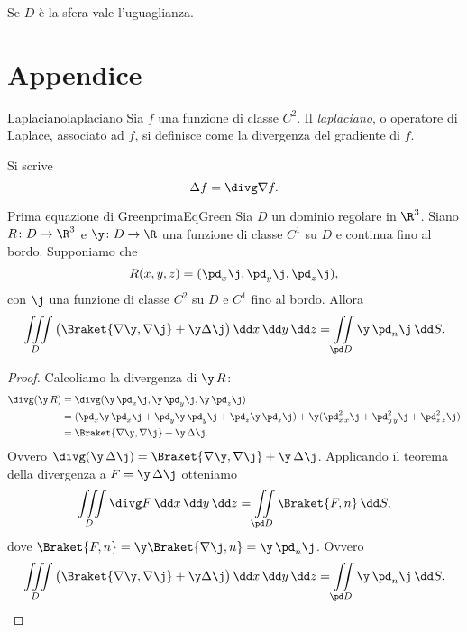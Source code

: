 \begin{oss}
	Se \(D\) è la sfera vale l'uguaglianza.
\end{oss}
\section{Appendice}

\begin{defn}{Laplaciano}{laplaciano}
	Sia \(f\) una funzione di classe \(C^2\).
	Il \emph{laplaciano}, o operatore di Laplace, associato ad \(f\), si definisce come la divergenza del gradiente di \(f\).
\end{defn}

\begin{notz}
	Si scrive
	\[
		\Delta f = \divg \nabla f.
	\]
\end{notz}

\begin{prop}{Prima equazione di Green}{primaEqGreen}
	Sia \(D\) un dominio regolare in \(\R^3\).
	Siano \(R\colon D \to \R^3\) e \(\y\colon D \to \R\) una funzione di classe \(C^1\) su \(D\) e continua fino al bordo.
	Supponiamo che
	\[
		R(x,y,z) = (\pd_x \j,\pd_y \j, \pd_z \j),
	\]
	con \(\j\) una funzione di classe \(C^2\) su \(D\) e \(C^1\) fino al bordo.
	Allora
	\[
		\iiint\limits_D \big(\Braket{\nabla \y,\nabla \j} + \y\Delta \j\big)\,\dd x\,\dd y\,\dd z = \iint\limits_{\pd D} \y\,\pd_n \j\,\dd S.
	\]
\end{prop}

\begin{proof}
	Calcoliamo la divergenza di \(\y\,R\):
	\[
		\begin{split}
			\divg (\y\,R) & = \divg(\y\,\pd _x\j, \y\,\pd_y \j,\y\,\pd_z \j)\\
			& = (\pd_x \y\,\pd_x \j + \pd_y \y\,\pd_y \j + \pd_z \y\,\pd _z \j) + \y(\pd_{x\,x}^2 \j + \pd_{y\,y}^2 \j + \pd_{z\,z}^2 \j)\\
			& = \Braket{\nabla \y,\nabla \j} + \y \,\Delta \j.
		\end{split}
	\]
	Ovvero \(\divg(\y\,\Delta \j) = \Braket{\nabla \y,\nabla \j} + \y\,\Delta \j\).
	Applicando il teorema della divergenza a \(F= \y\,\Delta \j\) otteniamo
	\[
		\iiint\limits_D \divg F\,\dd x\,\dd y\,\dd z = \iint\limits_{\pd D} \Braket{F,n}\,\dd S,
	\]
	dove \(\Braket{F,n} = \y \Braket{\nabla \j,n} = \y\,\pd_n \j\).
	Ovvero
	\[
		\iiint\limits_D \big(\Braket{\nabla \y,\nabla \j} + \y\Delta \j\big)\,\dd x\,\dd y\,\dd z = \iint\limits_{\pd D} \y\,\pd_n \j\,\dd S.\qedhere
	\]
\end{proof}

